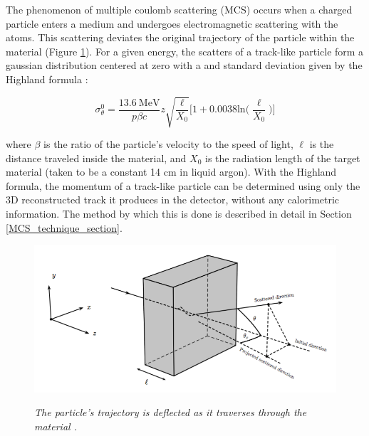 The phenomenon of multiple coulomb scattering (MCS) occurs when a charged particle enters a medium and undergoes electromagnetic scattering with the atoms. This scattering deviates the original trajectory of the particle within the material (Figure \ref{mcs_nocap_fig}). For a given energy, the scatters of a track-like particle form a gaussian distribution centered at zero with a and standard deviation given by the Highland formula \cite{highland}: 

\begin{equation}
	\sigma_\theta^0=\frac{13.6\  \text{MeV}}{p\beta c}z\sqrt{\frac{\ell}{X_0}}\Big[1+0.0038\text{ln}\Big(\frac{\ell}{X_0}\Big)\Big]
\end{equation}\label{highland_eqtn}

\noindent where $\beta$ is the ratio of the particle's velocity to the speed of light, $\ell$ is the distance traveled inside the material, and $X_0$ is the radiation length of the target material (taken to be a constant 14 cm in liquid argon). With the Highland formula, the momentum of a track-like particle can be determined using only the 3D reconstructed track it produces in the detector, without any calorimetric information. The method by which this is done is described in detail in Section \ref{MCS_technique_section}.

\begin{figure}[h!]
\centering
	\includegraphics[width=0.5\linewidth]{Figures/mcs_nocap.png} \\
\caption{\textit{The particle's trajectory is deflected as it traverses through the material \cite{leonidas1}.}}\label{mcs_nocap_fig}
\end{figure}